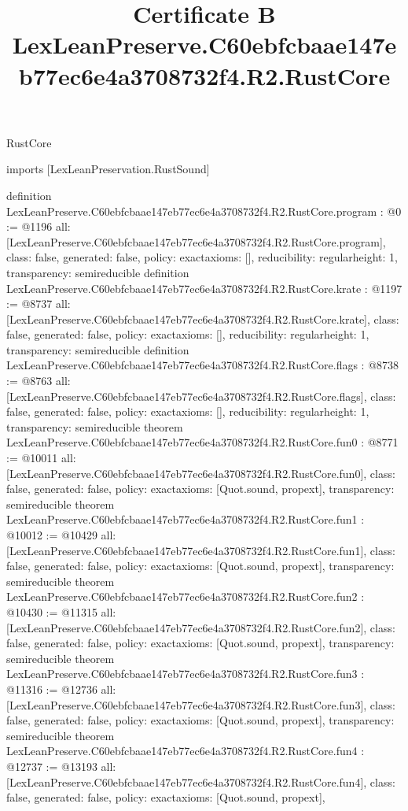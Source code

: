 \begin{lexlean}{RustCore}
\title{Certificate B LexLeanPreserve.C60ebfcbaae147eb77ec6e4a3708732f4.R2.RustCore}
\begin{coremodule}
imports [LexLeanPreservation.RustSound]

definition LexLeanPreserve.C60ebfcbaae147eb77ec6e4a3708732f4.R2.RustCore.program : @0 := @1196 {
  all: [LexLeanPreserve.C60ebfcbaae147eb77ec6e4a3708732f4.R2.RustCore.program],
  class: false,
  generated: false,
  policy: exact{axioms: []},
  reducibility: regular{height: 1},
  transparency: semireducible
}
definition LexLeanPreserve.C60ebfcbaae147eb77ec6e4a3708732f4.R2.RustCore.krate : @1197 := @8737 {
  all: [LexLeanPreserve.C60ebfcbaae147eb77ec6e4a3708732f4.R2.RustCore.krate],
  class: false,
  generated: false,
  policy: exact{axioms: []},
  reducibility: regular{height: 1},
  transparency: semireducible
}
definition LexLeanPreserve.C60ebfcbaae147eb77ec6e4a3708732f4.R2.RustCore.flags : @8738 := @8763 {
  all: [LexLeanPreserve.C60ebfcbaae147eb77ec6e4a3708732f4.R2.RustCore.flags],
  class: false,
  generated: false,
  policy: exact{axioms: []},
  reducibility: regular{height: 1},
  transparency: semireducible
}
theorem LexLeanPreserve.C60ebfcbaae147eb77ec6e4a3708732f4.R2.RustCore.fun0 : @8771 := @10011 {
  all: [LexLeanPreserve.C60ebfcbaae147eb77ec6e4a3708732f4.R2.RustCore.fun0],
  class: false,
  generated: false,
  policy: exact{axioms: [Quot.sound, propext]},
  transparency: semireducible
}
theorem LexLeanPreserve.C60ebfcbaae147eb77ec6e4a3708732f4.R2.RustCore.fun1 : @10012 := @10429 {
  all: [LexLeanPreserve.C60ebfcbaae147eb77ec6e4a3708732f4.R2.RustCore.fun1],
  class: false,
  generated: false,
  policy: exact{axioms: [Quot.sound, propext]},
  transparency: semireducible
}
theorem LexLeanPreserve.C60ebfcbaae147eb77ec6e4a3708732f4.R2.RustCore.fun2 : @10430 := @11315 {
  all: [LexLeanPreserve.C60ebfcbaae147eb77ec6e4a3708732f4.R2.RustCore.fun2],
  class: false,
  generated: false,
  policy: exact{axioms: [Quot.sound, propext]},
  transparency: semireducible
}
theorem LexLeanPreserve.C60ebfcbaae147eb77ec6e4a3708732f4.R2.RustCore.fun3 : @11316 := @12736 {
  all: [LexLeanPreserve.C60ebfcbaae147eb77ec6e4a3708732f4.R2.RustCore.fun3],
  class: false,
  generated: false,
  policy: exact{axioms: [Quot.sound, propext]},
  transparency: semireducible
}
theorem LexLeanPreserve.C60ebfcbaae147eb77ec6e4a3708732f4.R2.RustCore.fun4 : @12737 := @13193 {
  all: [LexLeanPreserve.C60ebfcbaae147eb77ec6e4a3708732f4.R2.RustCore.fun4],
  class: false,
  generated: false,
  policy: exact{axioms: [Quot.sound, propext]},
}
\end{coremodule}
\end{lexlean}
